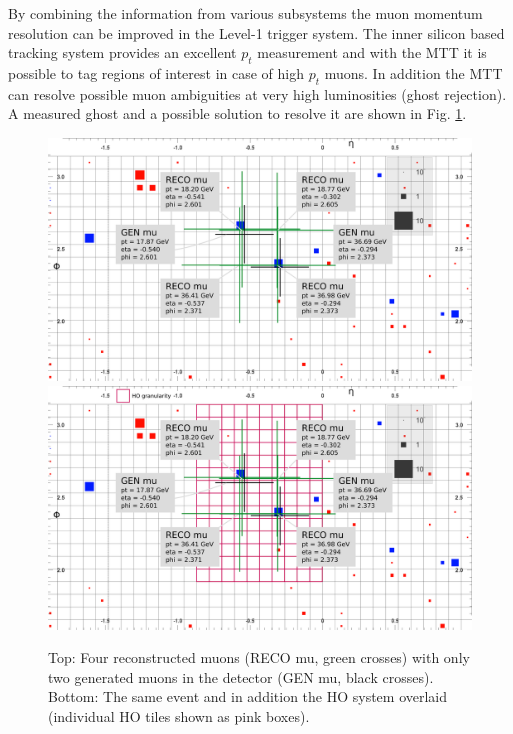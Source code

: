 By combining the information from various subsystems the muon momentum resolution can be improved in the Level-1 trigger system. The inner silicon based tracking system provides 
an excellent $p_t$ measurement and with the MTT it is possible to tag regions of interest in case of high $p_t$ muons. In addition the MTT can resolve possible muon 
ambiguities at very high luminosities (ghost rejection). A measured ghost and a possible solution to resolve it are shown in Fig. \ref{fig:ghosts}.
\begin{figure}[htbp]
\centering
\includegraphics[width=\textwidth]{Figures/pooth/GhostEvent01.png}
\includegraphics[width=\textwidth]{Figures/pooth/GhostEvent02.png}
\caption{Top: Four reconstructed muons (RECO mu, green crosses) with only two generated muons in the detector (GEN mu, black crosses). 
Bottom: The same event and in addition the HO system overlaid (individual HO tiles shown as pink boxes).} 
\label{fig:ghosts}
\end{figure}
